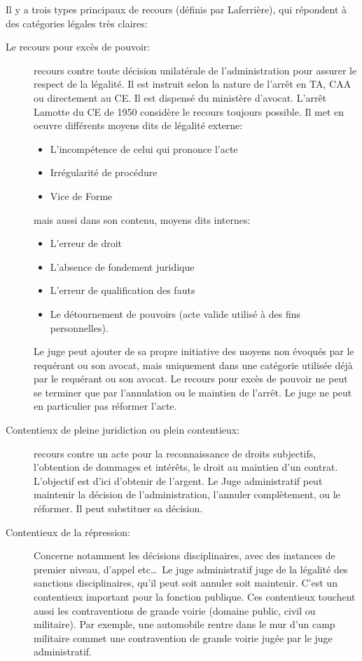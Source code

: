 \documentclass[math]{cours}
\begin{document}
Il y a trois types principaux de recours (définis par Laferrière), qui répondent à des catégories légales très claires:
\begin{description}
	\item[Le recours pour excès de pouvoir:]
	      recours contre toute décision unilatérale de l'administration pour assurer le respect de la légalité.
	      Il est instruit selon la nature de l'arrêt en TA, CAA ou directement au CE.
	      Il est dispensé du ministère d'avocat.
	      L'arrêt Lamotte du CE de 1950 considère le recours toujours possible.
	      Il met en oeuvre différents moyens dits de légalité externe:
	      \begin{itemize}
		      \item L'incompétence de celui qui prononce l'acte
		      \item Irrégularité de procédure
		      \item Vice de Forme
	      \end{itemize}
	      mais aussi dans son contenu, moyens dits internes:
	      \begin{itemize}
		      \item L'erreur de droit
		      \item L'absence de fondement juridique
		      \item L'erreur de qualification des fauts
		      \item Le détournement de pouvoirs (acte valide utilisé à des fins personnelles).
	      \end{itemize}
	      Le juge peut ajouter de sa propre initiative des moyens non évoqués par le requérant ou son avocat, mais uniquement dans une catégorie utilisée déjà par le requérant ou son avocat.
	      Le recours pour excès de pouvoir ne peut se terminer que par l'annulation ou le maintien de l'arrêt.
	      Le juge ne peut en particulier pas réformer l'acte.
	\item[Contentieux de pleine juridiction ou plein contentieux:]
	      recours contre un acte pour la reconnaissance de droits subjectifs, l'obtention de dommages et intérêts,
	      le droit au maintien d'un contrat.
	      L'objectif est d'ici d'obtenir de l'argent.
	      Le Juge administratif peut maintenir la décision de l'administration, l'annuler complètement, ou le réformer.
	      Il peut substituer sa décision.
	\item[Contentieux de la répression:]
	      Concerne notamment les décisions disciplinaires, avec des instances de premier niveau, d'appel etc\ldots\
	      Le juge administratif juge de la légalité des sanctions disciplinaires, qu'il peut soit annuler soit maintenir.
	      C'est un contentieux important pour la fonction publique.
	      Ces contentieux touchent aussi les contraventions de grande voirie (domaine public, civil ou militaire).
	      Par exemple, une automobile rentre dans le mur d'un camp militaire commet une contravention de grande voirie jugée par le juge administratif.
\end{description}
\end{document}
